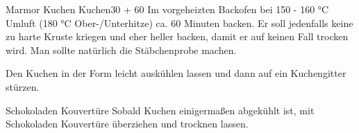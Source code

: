 \begin{MyRecipe}{Marmor Kuchen}{ Kuchen}{\SI{30}{\minuteprime} + \SI{60}{\minuteprime}}
	Im vorgeheizten Backofen bei 150 - 160 °C Umluft (180 °C Ober-/Unterhitze) ca. 60 Minuten backen. Er soll jedenfalls keine zu harte Kruste kriegen und eher heller backen, damit er auf keinen Fall trocken wird. Man sollte natürlich die Stäbchenprobe machen.
	
	Den Kuchen in der Form leicht auskühlen lassen und dann auf ein Kuchengitter stürzen.
	
	\ingredient[\Calc{0.4}{\x}]{\si{\kilogram}} {Schokoladen Kouvertüre}
	Sobald Kuchen einigermaßen abgekühlt ist, mit Schokoladen Kouvertüre überziehen und trocknen lassen.
	
\end{MyRecipe}